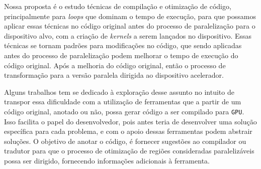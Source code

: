 Nossa proposta é o estudo técnicas de compilação e otimização de código, principalmente para \textit{loops} que dominam o tempo de execução, para que possamos aplicar essas técnicas no código original antes do processo de paralelização para o dispositivo alvo, com a criação de \textit{kernels} a serem lançados no dispositivo. Essas técnicas se tornam padrões para modificações no código, que sendo aplicadas antes do processo de paralelização podem melhorar o tempo de execução do código original. Após a melhoria do código original, então o processo de transformação para a versão paralela dirigida ao dispositivo acelerador.

Alguns trabalhos tem se dedicado à exploração desse assunto no intuito de transpor essa dificuldade com a utilização de ferramentas que a partir de um código original, anotado ou não, possa gerar código a ser compilado para \texttt{GPU}. Isso facilita o papel do desenvolvedor, pois antes teria de desenvolver uma solução específica para cada problema, e com o apoio dessas ferramentas podem abstrair soluções. O objetivo de anotar o código, é fornecer sugestões ao compilador ou tradutor para que o processo de otimização de regiões consideradas paralelizáveis possa ser dirigido, fornecendo informações adicionais à ferramenta.
